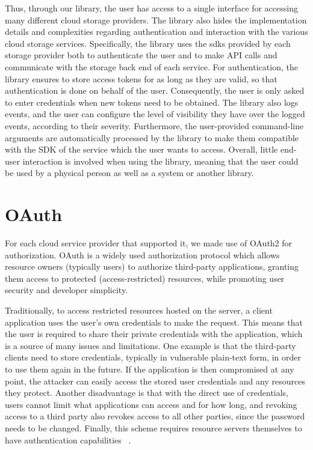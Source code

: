 Thus, through our library, the user has access to a single interface for accessing many different cloud storage providers. The library also hides the implementation details and complexities regarding authentication and interaction with the various cloud storage services. Specifically, the library uses the \acp{sdk} provided by each storage provider both to authenticate the user and to make API calls and communicate with the storage back end of each service. For authentication, the library ensures to store access tokens for as long as they are valid, so that authentication is done on behalf of the user. Consequently, the user is only asked to enter credentials when new tokens need to be obtained. The library also logs events, and the user can configure the level of visibility they have over the logged events, according to their severity. Furthermore, the user-provided command-line arguments are automatically processed by the library to make them compatible with the SDK of the service which the user wants to access. Overall, little end-user interaction is involved when using the library, meaning that the user could be used by a physical person as well as a system or another library.


\section{OAuth}
For each cloud service provider that supported it, we made use of OAuth2 for authorization. OAuth is a widely used authorization protocol which allows resource owners (typically users) to authorize third-party applications, granting them access to protected (access-restricted) resources, while promoting user security and developer simplicity.  

Traditionally, to access restricted resources hosted on the server, a client application uses the user's own credentials  to make the request. This means that the user is required to share their private credentials with the application, which is a source of many issues and limitations. One example is that the third-party clients need to store credentials, typically in vulnerable plain-text form,  in order to use them again in the future. If the application is then compromised at any point, the attacker can easily access the stored user credentials and any resources they protect. Another disadvantage is that with the direct use of credentials, users cannot limit what applications can access and for how long, and revoking access to a third party also revokes access to all other parties, since the password needs to be changed. Finally, this scheme requires resource servers themselves to have authentication capabilities ~\cite{oauth}.

